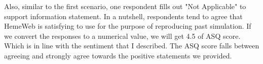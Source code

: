 Also, similar to the first scenario, one respondent fills out "Not Applicable" to support information statement. In a nutshell, respondents tend to agree that HemeWeb is satisfying to use for the purpose of reproducing past simulation. If we convert the responses to a numerical value, we will get 4.5 of ASQ score. Which is in line with the sentiment that I described. The ASQ score falls between agreeing and strongly agree towards the positive statements we provided.


\vspace{0.5cm}

\noindent%
\begin{minipage}{\linewidth}%
 \label{fig:survey-s2-cli}%
\end{minipage}

\vspace{0.5cm}

\noindent%
\begin{minipage}{\linewidth}%
 \label{fig:survey-s2-cli-barrier}%
\end{minipage}

